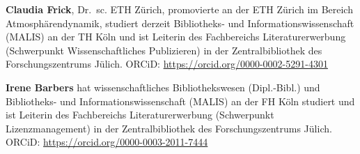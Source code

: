 \documentclass[a4paper,
fontsize=11pt,
oneside,
numbers=noperiodatend,
parskip=half-,
bibliography=totoc,
final
]{scrartcl}
\begin{document}
\textbf{Claudia Frick}, Dr.~sc. ETH Zürich, promovierte an der ETH
Zürich im Bereich Atmosphärendynamik, studiert derzeit Bibliotheks- und
Informationswissenschaft (MALIS) an der TH Köln und ist Leiterin des
Fachbereichs Literaturerwerbung (Schwerpunkt Wissenschaftliches
Publizieren) in der Zentralbibliothek des Forschungszentrums Jülich.
ORCiD:
\href{https://orcid.org/0000-0002-5291-4301}{https://orcid.org/0000-0002-5291-4301}

\textbf{Irene Barbers} hat wissenschaftliches Bibliothekswesen
(Dipl.-Bibl.) und Bibliotheks- und Informationswissenschaft (MALIS) an
der FH Köln studiert und ist Leiterin des Fachbereichs
Literaturerwerbung (Schwerpunkt Lizenzmanagement) in der
Zentralbibliothek des Forschungszentrums Jülich. ORCiD:
\href{https://orcid.org/0000-0003-2011-7444}{https://orcid.org/0000-0003-2011-7444}
\end{document}
